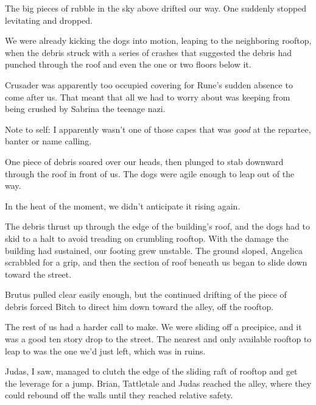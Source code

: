 The big pieces of rubble in the sky above drifted our way.  One suddenly stopped levitating and dropped.



We were already kicking the dogs into motion, leaping to the neighboring rooftop, when the debris struck with a series of crashes that suggested the debris had punched through the roof and even the one or two floors below it.



Crusader was apparently too occupied covering for Rune's sudden absence to come after us.  That meant that all we had to worry about was keeping from being crushed by Sabrina the teenage nazi.



Note to self:  I apparently wasn't one of those capes that was \emph{good} at the repartee, banter or name calling.



One piece of debris soared over our heads, then plunged to stab downward through the roof in front of us.  The dogs were agile enough to leap out of the way.



In the heat of the moment, we didn't anticipate it rising again.



The debris thrust up through the edge of the building's roof, and the dogs had to skid to a halt to avoid treading on crumbling rooftop.  With the damage the building had sustained, our footing grew unstable.  The ground sloped, Angelica scrabbled for a grip, and then the section of roof beneath us began to slide down toward the street.



Brutus pulled clear easily enough, but the continued drifting of the piece of debris forced Bitch to direct him down toward the alley, off the rooftop.



The rest of us had a harder call to make.  We were sliding off a precipice, and it was a good ten story drop to the street.  The nearest and only available rooftop to leap to was the one we'd just left, which was in ruins.



Judas, I saw, managed to clutch the edge of the sliding raft of rooftop and get the leverage for a jump.  Brian, Tattletale and Judas reached the alley, where they could rebound off the walls until they reached relative safety.



